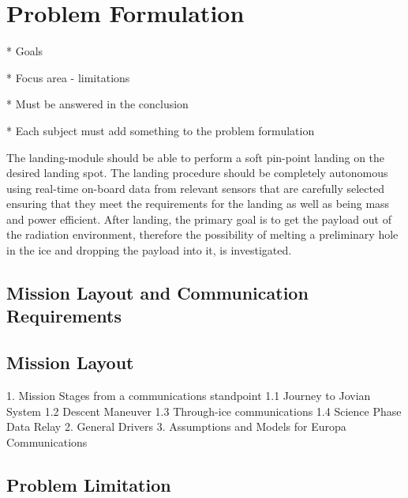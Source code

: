 \chapter{Problem Formulation}

* Goals

* Focus area - limitations

* Must be answered in the conclusion

* Each subject must add something to the problem formulation

The landing-module should be able to perform a soft pin-point landing on the desired landing spot. The landing procedure should be completely autonomous using real-time on-board data from relevant sensors that are carefully selected ensuring that they meet the requirements for the landing as well as being mass and power efficient. After landing, the primary goal is to get the payload out of the radiation environment, therefore the possibility of melting a preliminary hole in the ice and dropping the payload into it, is investigated.

\section{Mission Layout and Communication Requirements}

\section{Mission Layout}

%



1. Mission Stages from a communications standpoint
    1.1 Journey to Jovian System
    1.2 Descent Maneuver
    1.3 Through-ice communications
    1.4 Science Phase Data Relay
2. General Drivers
3. Assumptions and Models for Europa Communications

\section{Problem Limitation}
